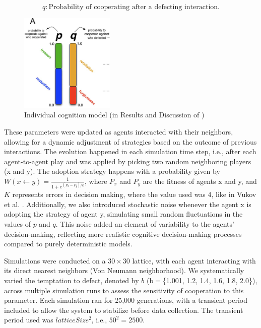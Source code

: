\documentclass[runningheads]{llncs}
\begin{document}
\[
q: \text{Probability of cooperating after a defecting interaction.}
\]


\begin{figure}[htbp]
    \centering
    \includegraphics[width=0.4\textwidth]{modellingindividualcognition.png}
    \caption{Individual cognition model (in Results and Discussion of \cite{vukov})}
    \label{fig:coop_vs_b}
\end{figure}

These parameters were updated as agents interacted with their neighbors, allowing
for a dynamic adjustment of strategies based on the outcome of previous interactions.
The evolution happened in each simulation time step,
i.e., after each agent-to-agent play and was applied by picking two random
neighboring players (x and y). The adoption strategy happens with a probability
given by $W(x \leftarrow y) = \frac{1}{1 + e^{(P_x - P_y)/k}}$, where $P_x$ and $P_y$
are the fitness of agents x and y, and $K$ represents errors in decision making,
where the value used was 4, like in Vukov et al. \cite{vukov}.
Additionally, we also introduced stochastic noise whenever the agent x is
adopting the strategy of agent y, simulating small random fluctuations in the
values of \( p \) and \( q \).
This noise added an element of variability to the agents' decision-making,
reflecting more realistic cognitive decision-making processes compared to
purely deterministic models.


Simulations were conducted on a \( 30 \times 30 \) lattice, with each agent interacting
with its direct nearest neighbors (Von Neumann neighborhood). We systematically
varied the temptation to defect, denoted by \( b \) (b$=$\{1.001, 1.2, 1.4, 1.6, 1.8, 2.0\}), across multiple simulation
runs to assess the sensitivity of cooperation to this parameter. Each simulation
ran for 25,000 generations, with a transient period included to allow the system
to stabilize before data collection. The transient period used was $latticeSize^2$,
i.e., $50^2 = 2500$.
\end{document}
